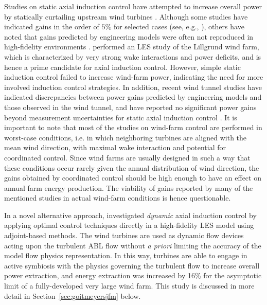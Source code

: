 Studies on static axial induction control have attempted to increase overall power by statically curtailing upstream wind turbines \citep{knudsen2015survey}. Although some studies have indicated gains in the order of $5\%$ for selected cases (see, e.g., \citealp{horvat2012quasi, johnson2012assessment, gebraad2015maximum, vali2017adjoint}), others have noted that gains predicted by engineering models were often not reproduced in high-fidelity environments \citep{annoni2016analysis}. \cite{nilsson2015large} performed an LES study of the Lillgrund wind farm, which is characterized by very strong wake interactions and power deficits, and is hence a prime candidate for axial induction control. However, simple static induction control failed to increase wind-farm power, indicating the need for more involved induction control strategies. In addition, recent wind tunnel studies have indicated discrepancies between power gains predicted by engineering models and those observed in the wind tunnel, and have reported no significant power gains beyond measurement uncertainties for static axial induction control  \citep{campagnolo2016wind, bartl2016experimental}. It is important to note that most of the studies on wind-farm control are performed in worst-case conditions, i.e. in which neighboring turbines are aligned with the mean wind direction, with maximal wake interaction and potential for coordinated control. Since wind farms are usually designed in such a way that these conditions occur rarely given the annual distribution of wind direction, the gains obtained by coordinated control should be high enough to have an effect on annual farm energy production. The viability of gains reported by many of the mentioned studies in actual wind-farm conditions is hence questionable.  

In a novel alternative approach, \cite{goit2015optimal} investigated \emph{dynamic} axial induction control by applying optimal control techniques directly in a high-fidelity LES model using adjoint-based methods. The wind turbines are used as dynamic flow devices acting upon the turbulent ABL flow without \emph{a priori} limiting the accuracy of the model flow physics representation. In this way, turbines are able to engage in active symbiosis with the physics governing the turbulent flow to increase overall power extraction, and energy extraction was increased by 16\% for the asymptotic limit of a fully-developed very large wind farm. This study is discussed in more detail in Section~\ref{sec:goitmeyersjfm} below.
\clearpage
